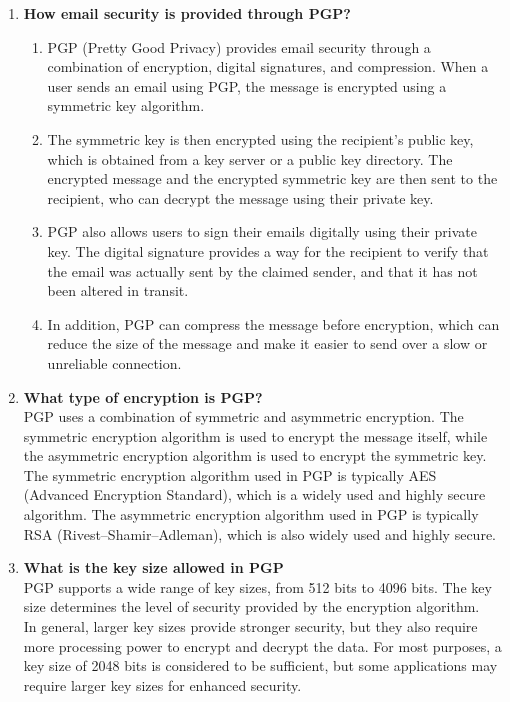\documentclass[11pt]{article}
\begin{document}
\begin{enumerate}
    \item \textbf{How email security is provided through PGP?}\\

          \begin{enumerate}
              \item PGP (Pretty Good Privacy) provides email security through a combination of encryption, digital signatures, and compression. When a user sends an email using PGP, the message is encrypted using a symmetric key algorithm.

              \item The symmetric key is then encrypted using the recipient's public key, which is obtained from a key server or a public key directory. The encrypted message and the encrypted symmetric key are then sent to the recipient, who can decrypt the message using their private key.

              \item PGP also allows users to sign their emails digitally using their private key. The digital signature provides a way for the recipient to verify that the email was actually sent by the claimed sender, and that it has not been altered in transit.
              \item In addition, PGP can compress the message before encryption, which can reduce the size of the message and make it easier to send over a slow or unreliable connection.
          \end{enumerate}

    \item \textbf{What type of encryption is PGP?}\\

          PGP uses a combination of symmetric and asymmetric encryption. The symmetric encryption algorithm is used to encrypt the message itself, while the asymmetric encryption algorithm is used to encrypt the symmetric key.\\

          The symmetric encryption algorithm used in PGP is typically AES (Advanced Encryption Standard), which is a widely used and highly secure algorithm. The asymmetric encryption algorithm used in PGP is typically RSA (Rivest–Shamir–Adleman), which is also widely used and highly secure.

    \item \textbf{What is the key size allowed in PGP}\\

          PGP supports a wide range of key sizes, from 512 bits to 4096 bits. The key size determines the level of security provided by the encryption algorithm.\\

          In general, larger key sizes provide stronger security, but they also require more processing power to encrypt and decrypt the data. For most purposes, a key size of 2048 bits is considered to be sufficient, but some applications may require larger key sizes for enhanced security.


\end{enumerate}
\end{document}
